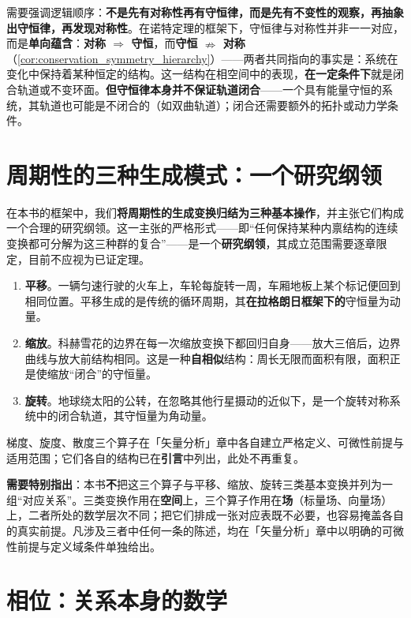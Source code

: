需要强调逻辑顺序：\textbf{不是先有对称性再有守恒律，而是先有不变性的观察，再抽象出守恒律，再发现对称性}。在诺特定理的框架下，守恒律与对称性并非一一对应，而是\textbf{单向蕴含}：\textbf{对称 $\Rightarrow$ 守恒}，而\textbf{守恒 $\nRightarrow$ 对称}（\cref{cor:conservation_symmetry_hierarchy}）——两者共同指向的事实是：系统在变化中保持着某种恒定的结构。这一结构在相空间中的表现，\textbf{在一定条件下}就是闭合轨道或不变环面。\textbf{但守恒律本身并不保证轨道闭合}——一个具有能量守恒的系统，其轨道也可能是不闭合的（如双曲轨道）；闭合还需要额外的拓扑或动力学条件。

\section*{周期性的三种生成模式：一个研究纲领}

在本书的框架中，我们\textbf{将周期性的生成变换归结为三种基本操作}，并主张它们构成一个合理的研究纲领。这一主张的严格形式——即“任何保持某种内禀结构的连续变换都可分解为这三种群的复合”——是一个\textbf{研究纲领}，其成立范围需要逐章限定，目前不应视为已证定理。

\begin{enumerate}[leftmargin=2em, label={(\arabic*)}]
    \item \textbf{平移}。一辆匀速行驶的火车上，车轮每旋转一周，车厢地板上某个标记便回到相同位置。平移生成的是传统的循环周期，其\textbf{在拉格朗日框架下的}守恒量为动量。
    \item \textbf{缩放}。科赫雪花的边界在每一次缩放变换下都回归自身——放大三倍后，边界曲线与放大前结构相同。这是一种\textbf{自相似}结构：周长无限而面积有限，面积正是使缩放“闭合”的守恒量。
    \item \textbf{旋转}。地球绕太阳的公转，在忽略其他行星摄动的近似下，是一个旋转对称系统中的闭合轨道，其守恒量为角动量。
\end{enumerate}

梯度、旋度、散度三个算子在「矢量分析」章中各自建立严格定义、可微性前提与适用范围；它们各自的结构已在\textbf{引言}中列出，此处不再重复。

\textbf{需要特别指出}：本书\textbf{不}把这三个算子与平移、缩放、旋转三类基本变换并列为一组“对应关系”。三类变换作用在\textbf{空间}上，三个算子作用在\textbf{场}（标量场、向量场）上，二者所处的数学层次不同；把它们排成一张对应表既不必要，也容易掩盖各自的真实前提。凡涉及三者中任何一条的陈述，均在「矢量分析」章中以明确的可微性前提与定义域条件单独给出。

\section*{相位：关系本身的数学}

